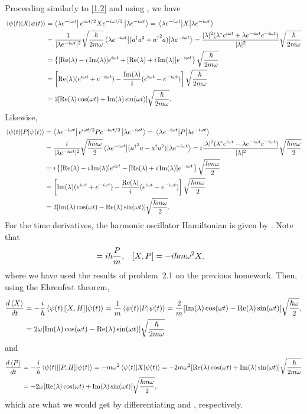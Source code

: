 \begin{solution}
	Proceeding similarly to \ref{1.2} and using , we have
	\begin{align}
		\ev{X}{\psit} &= \blamt \eiwtf X \emiwtf \klamt
		= \ev{X}{\lamt} \notag \\
		&= \frac{1}{|\lamt|^2} \sqrt{\frac{\hbar}{2 m \omega}} \ev{(\ad a^2 + {\ad}^2 a)}{\lamt}
		= \frac{|\lam|^2 (\lam^* \eiwt + \lamt \emiwt)}{|\lam|^2} \sqrt{\frac{\hbar}{2 m \omega}} \notag \\
		&= \left\{ [\Rel - i \Iml] \eiwt + [\Rel + i \Iml] \emiwt \right\} \sqrt{\frac{\hbar}{2 m \omega}} \notag \\
		&= \left[ \Rel (\eiwt + \emiwt) - \frac{\Iml}{i} (\eiwt - \emiwt) \right] \sqrt{\frac{\hbar}{2 m \omega}} \notag \\
		&= 2 [\Rel \coswt + \Iml \sinwt] \sqrt{\frac{\hbar}{2 m \omega}}. \label{evXt}
	\end{align}
	Likewise,
	\begin{align}
		\ev{P}{\psit} &= \blamt \eiwtf P \emiwtf \klamt
		= \ev{P}{\lamt} \notag \\
		&=  \frac{i}{|\lamt|^2} \sqrt{\frac{\hbar m \omega}{2}} \ev{({\ad}^2 a - \ad a^2)}{\lamt}
		= i \frac{|\lam|^2 (\lam^* \eiwt - \lamt \emiwt)}{|\lam|^2} \sqrt{\frac{\hbar m \omega}{2}} \notag \\
		&= i \left\{ [\Rel - i \Iml] \eiwt - [\Rel + i \Iml] \emiwt \right\} \sqrt{\frac{\hbar m \omega}{2}} \notag \\
		&= \left[ \Iml (\eiwt + \emiwt) - \frac{\Rel}{i} (\eiwt - \emiwt) \right] \sqrt{\frac{\hbar m \omega}{2}} \notag \\
		&= 2 [\Iml \coswt - \Rel \sinwt] \sqrt{\frac{\hbar m \omega}{2}}. \label{evPt}
	\end{align}
	For the time derivatives, the harmonic oscillator Hamiltonian is given by .  Note that
	\begin{align*}
		[X, H] &= \ihb \frac{P}{m}, &
		[X, P] &= -\ihb m \omega^2 X,
	\end{align*}
	where we have used the results of problem~2.1 on the previous homework.  Then, using the Ehrenfest theorem,
	\begin{align*}
		\dv{\ev{X}}{t} &= -\frac{i}{\hbar} \ev{[X, H]}{\psit}
		= \frac{1}{m} \ev{P}{\psit}
		= \frac{2}{m} [\Iml \coswt - \Rel \sinwt] \sqrt{\frac{\hbar \omega}{2}}, \\
		&= 2 \omega [\Iml \coswt - \Rel \sinwt] \sqrt{\frac{\hbar}{2 m \omega}}
	\end{align*}
	and
	\begin{align*}
		\dv{\ev{P}}{t} &= -\frac{i}{\hbar} \ev{[P, H]}{\psit}
		= - m \omega^2 \ev{X}{\psit}
		= -2 m \omega^2 [\Rel \coswt + \Iml \sinwt] \sqrt{\frac{\hbar}{2 m \omega}} \\
		&= -2 \omega [\Rel \coswt + \Iml \sinwt] \sqrt{\frac{\hbar m \omega}{2}},
	\end{align*}
	which are what we would get by differentiating  and , respectively.
\end{solution}

